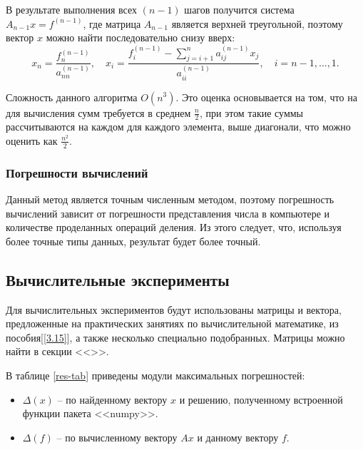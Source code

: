         В результате выполнения всех $(n-1)$ шагов получится система $ A_{n-1} x = f^{(n-1)} $, где матрица $ A_{n-1} $ является верхней треугольной, поэтому вектор $ x $ можно найти последовательно снизу вверх:
        \[
            x_n = \frac{ f_n^{(n-1)} }{ a_{nn}^{(n-1)} }, \quad x_i = \frac{ f_i^{(n-1)} - \sum\limits_{j=i+1}^n a_{ij}^{(n-1)} x_j  }{ a_{ii}^{(n-1)} }, \quad
            i = n-1, \dots, 1.
        \]

    
        Сложность данного алгоритма $O(n^3)$. Это оценка основывается на том, что на для вычисления сумм требуется в среднем $ \frac{n}{2} $, при этом такие суммы рассчитываются на каждом для каждого элемента, выше диагонали, что можно оценить как $ \frac{n^2}{2} $.

    
    \subsubsection{Погрешности вычислений}
        Данный метод является точным численным методом, поэтому погрешность вычислений зависит от погрешности представления числа в компьютере и количестве проделанных операций деления. Из этого следует, что, используя более точные типы данных, результат будет более точный.


    \subsection{Вычислительные эксперименты}
        Для вычислительных экспериментов будут использованы матрицы и вектора, предложенные на практических занятиях по вычислительной математике, из пособия[\ref{3.15}], а также несколько специально подобранных. Матрицы можно найти в секции <<>>.

        В таблице \ref{res-tab} приведены модули максимальных погрешностей:
        \begin{itemize}
            \item $ \Delta(x) $ -- по найденному вектору $ x $ и решению, полученному встроенной функции пакета <<numpy>>.
            \item $ \Delta(f) $ -- по вычисленному вектору $ Ax $ и данному вектору $ f $.
        \end{itemize}

